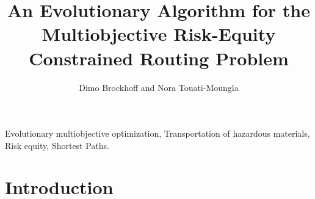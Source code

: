 \documentclass[preprint,12pt]{elsarticle}
\begin{document}
\begin{frontmatter}



\title{An Evolutionary Algorithm for the Multiobjective Risk-Equity Constrained Routing Problem}


\author{Dimo Brockhoff and Nora Touati-Moungla}

\address{Laboratoire d'Informatique, \'{E}cole Polytechnique, 91128 Palaiseau Cedex, France\\
\{Brockhoff, touati\}@lix.polytechnique.fr}

\begin{abstract}


\end{abstract}

\begin{keyword}
Evolutionary multiobjective optimization, Transportation of hazardous materials, Risk equity, Shortest Paths. 
\end{keyword}

\end{frontmatter}
\section{Introduction}
\end{document}
